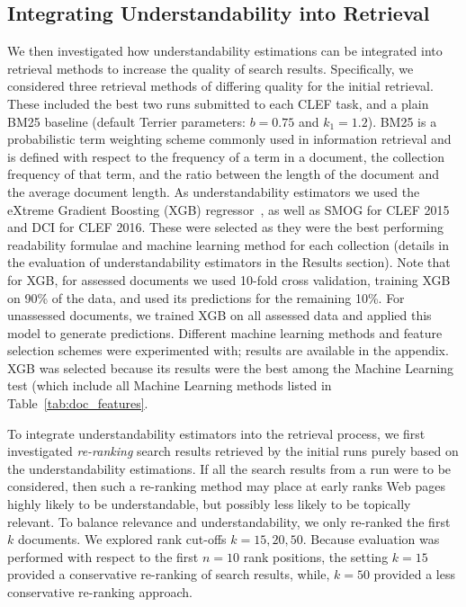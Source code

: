 \documentclass[10pt,a4paper]{article}
\begin{document}
\subsection*{Integrating Understandability into Retrieval}
\label{sec:method_ltr}

We then investigated how understandability estimations can be integrated into retrieval methods to increase the quality of search results.
Specifically, we considered three retrieval methods of differing quality for the initial retrieval. These included the best two runs submitted to each CLEF task, and a plain BM25 baseline (default Terrier parameters: $b=0.75$ and $k_1=1.2$). BM25 is a probabilistic term weighting scheme commonly used in information retrieval and is defined with respect to the frequency of a term in a document, the collection frequency of that term, and the ratio between the length of the document and the average document length. As understandability estimators we used the eXtreme Gradient Boosting (XGB) regressor~\cite{chen16}, as well as SMOG for CLEF 2015 and DCI for CLEF 2016. 
These were selected as they were the best performing readability formulae and machine learning method for each collection (details in the evaluation of understandability estimators in the Results section).
Note that for XGB, for assessed documents we used 10-fold cross validation, training XGB on 90\% of the data, and used its predictions for the remaining 10\%. For unassessed documents, we trained XGB on all assessed data and applied this model to generate predictions. Different machine learning methods and feature selection schemes were experimented with; results are available in the appendix. XGB was selected because its results were the best among the Machine Learning test (which include all Machine Learning methods listed in Table~\ref{tab:doc_features}.


To integrate understandability estimators into the retrieval process, we first investigated \textit{re-ranking} search results retrieved by the initial runs purely based on the understandability estimations. 
If all the search results from a run were to be considered, then such a re-ranking method may place at early ranks Web pages highly likely to be understandable, but possibly less likely to be topically relevant. To balance relevance and understandability, we only re-ranked the first $k$ documents. We explored rank cut-offs $k = 15, 20, 50$. Because evaluation was performed with respect to the first $n=10$ rank positions, the setting $k=15$ provided a conservative re-ranking of search results, while, $k=50$ provided a less conservative re-ranking approach.
\end{document}
